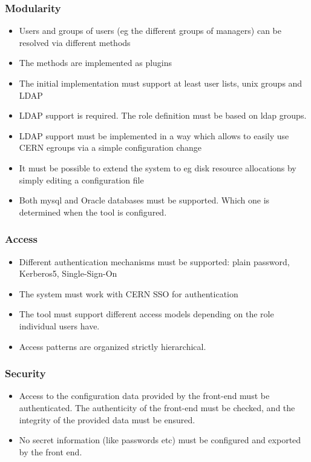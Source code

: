 \documentclass[12pt]{article}
\begin{document}
\subsubsection{Modularity}
\begin{itemize}
\item Users and groups of users (eg the different groups of managers) can be resolved via different methods
\item The methods are implemented as plugins
\item The initial implementation must support at least user lists, unix groups and LDAP
\item LDAP support is required. The role definition must be based on ldap groups.
\item LDAP support must be implemented in a way which allows to easily use CERN egroups via a simple configuration change
\item It must be possible to extend the system to eg disk resource allocations by simply editing a configuration file   
\item Both mysql and Oracle databases must be supported. Which one is determined when the tool is configured. 
\end{itemize}

\subsubsection{Access}
\begin{itemize}
\item Different authentication mechanisms must be supported: plain password, Kerberos5, Single-Sign-On
\item The system must work with CERN SSO for authentication
\item The tool must support different access models depending on the role individual users have. 
\item Access patterns are organized strictly hierarchical. 
\end{itemize}

\subsubsection{Security}
\begin{itemize}
\item Access to the configuration data provided by the front-end must be authenticated. The authenticity of the front-end must be checked, and the integrity of the provided data must be ensured.
\item No secret information (like passwords etc) must be configured and exported by the front end.
\end{itemize}
\end{document}
